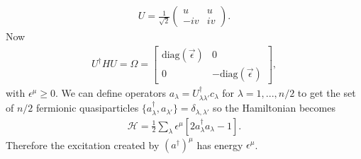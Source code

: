 \documentclass[reprint,amsmath,amssymb,aps,prl,groupedaddress,nofootinbib,superscriptaddress]{revtex4-1}
\newcommand{\1}{\mathds{1}}
\begin{document}
\begin{align}\label{U}
U = \frac{1}{\sqrt{2}}\left(\begin{array}{cc}
u & u \\
-iv & iv
\end{array}\right).
\end{align}
Now
\begin{align}
U^\dag H U = \Omega = \left[\begin{array}{cc}
\text{diag}(\vec{\epsilon}) & 0 \\
0 & -\text{diag}(\vec{\epsilon})
\end{array}\right],
\end{align}
with $\epsilon^\mu \geq 0$.
We can define operators $a_\lambda = U^\dag_{\lambda \lambda'} c_\lambda$ for $\lambda = 1,...,n/2$ to get the set of $n/2$ fermionic quasiparticles \mbox{$\{a^\dagger_\lambda , a_{\lambda'} \}= \delta_{\lambda,\lambda'}$} so the Hamiltonian becomes
\begin{align}\label{Ha}
\mathcal{H} =  \frac{1}{2}\sum_{\lambda}\epsilon^\mu \left[2 a_\lambda^\dagger a_\lambda - 1 \right].
\end{align}
Therefore the excitation created by $(a^\dagger)^\mu$ has energy $\epsilon^\mu$.
\end{document}
